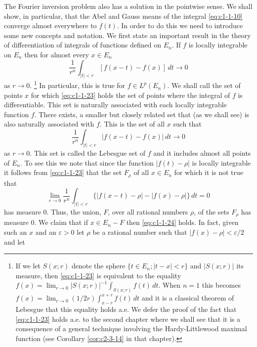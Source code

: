 The Fourier inversion problem also has a solution in the pointwise sense. We
shall show, in particular, that the Abel and Gauss means of the integral
\eqref{eq:c1-1-10} converge almost everywhere to $f(t)$. In order to do this we
need to introduce some new concepts and notation. We first state an important
result in the theory of differentiation of integrals of functions defined on
$E_{n}$. If $f$ is locally integrable on $E_{n}$ then for almost every
$x \in E_{n}$
\begin{equation}\label{eq:c1-1-23}
\frac{1}{r^{n}}\int_{|t|<r}[f(x-t)-f(x)]\,dt\to0
\end{equation}
as $r \to 0$.%
\footnote{If we let $S(x;r)$ denote the sphere
$\{t\in E_{n};|t-x|<r\}$ and $|S(x;r)|$ its measure, then \eqref{eq:c1-1-23} is
equivalent to the equality
$f(x)=\lim_{r\to0}|S(x;r)|^{-1}\int_{S(x;r)}f(t)\,dt$. When $n=1$ this becomes
$f(x)=\lim_{r\to0}(1/2r)\int_{x-r}^{x+r}f(t)\,dt$ and it is a classical theorem
of Lebesgue that this equality holds a.e. We defer the proof of the fact that
\eqref{eq:c1-1-23} holds a.e. to the second chapter where we shall see that it is
a consequence of a general technique involving the Hardy-Littlewood maximal
function (see Corollary \ref{cor:c2-3-14} in that chapter).}
In particular, this is true for $f \in L^{p}(E_{n})$. We shall call the set of
points $x$ for which \eqref{eq:c1-1-23} holds the set of points where the
integral of $f$ is differentiable. This set is naturally associated with each
locally integrable function $f$. There exists, a smaller but closely related set
that (as we shall see) is also naturally associated with $f$. This is the set of
all $x$ such that
\begin{equation}\label{eq:c1-1-24}
\frac{1}{r^{n}}\int_{|t|<r}|f(x-t)-f(x)|\,dt\to0
\end{equation}
as $r \to 0$. This set is called the Lebesgue set of $f$ and it includes almost
all points of $E_{n}$. To see this we note that since the function
$|f(t) - \rho|$ is locally integrable it follows from \eqref{eq:c1-1-23} that the
set $F_{\rho}$ of all $x \in E_{n}$ for which it is not true that
\[
\lim_{r\to0}\frac{1}{r^{n}}\int_{|t|<r}\{|f(x-t)-\rho|-|f(x)-\rho|\}\,dt=0
\]
has measure $0$. Thus, the union, $F$, over all rational numbers $\rho$, of the
sets $F_{\rho}$ has measure $0$. We claim that if $x \in E_{n} - F$ then
\eqref{eq:c1-1-24} holds. In fact, given such an $x$ and an $\varepsilon > 0$
let $\rho$ be a rational number such that $|f(x) - \rho| < \varepsilon/2$ and let
